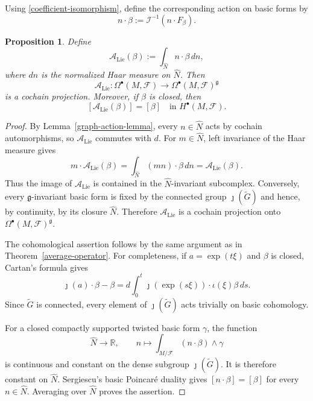 \documentclass[reqno, 11pt]{amsart}
\newtheorem{prop}[thm]{Proposition}
\theoremstyle{definition}
\theoremstyle{property}
\theoremstyle{remark}
\numberwithin{equation}{section}
\begin{document}
Using \eqref{coefficient-isomorphism}, define the corresponding action on
basic forms by
\[
n\cdot\beta
:=
\mathcal I^{-1}(n\cdot F_\beta).
\]

\begin{prop}\label{direct-lie-averaging}
Define
\begin{equation}\label{direct-average}
\mathcal A_{\mathrm{Lie}}(\beta)
:=
\int_{\widehat N}n\cdot\beta\,dn,
\end{equation}
where $dn$ is the normalized Haar measure on $\widehat N$. Then
\[
\mathcal A_{\mathrm{Lie}}:
\Omega^\bullet(M,\mathcal F)
\longrightarrow
\Omega^\bullet(M,\mathcal F)^{\mathfrak g}
\]
is a cochain projection. Moreover, if $\beta$ is closed, then
\[
[\mathcal A_{\mathrm{Lie}}(\beta)]
=
[\beta]
\quad\text{in }H^\bullet(M,\mathcal F).
\]
\end{prop}

\begin{proof}
By Lemma~\ref{graph-action-lemma}, every $n\in\widehat N$ acts by cochain
automorphisms, so $\mathcal A_{\mathrm{Lie}}$ commutes with $d$. For
$m\in\widehat N$, left invariance of the Haar measure gives
\[
m\cdot\mathcal A_{\mathrm{Lie}}(\beta)
=
\int_{\widehat N}(mn)\cdot\beta\,dn
=
\mathcal A_{\mathrm{Lie}}(\beta).
\]
Thus the image of $\mathcal A_{\mathrm{Lie}}$ is contained in the
$\widehat N$-invariant subcomplex. Conversely, every
$\mathfrak g$-invariant basic form is fixed by the connected group
$\jmath(\widetilde G)$ and hence, by continuity, by its closure
$\widehat N$. Therefore $\mathcal A_{\mathrm{Lie}}$ is a cochain projection
onto $\Omega^\bullet(M,\mathcal F)^{\mathfrak g}$.

The cohomological assertion follows by the same argument as in
Theorem~\ref{average-operator}. For completeness, if
$a=\exp(t\xi)$ and $\beta$ is closed, Cartan's formula gives
\[
\jmath(a)\cdot\beta-\beta
=
d\int_0^t
\jmath(\exp(s\xi))\cdot\iota(\xi)\beta\,ds.
\]
Since $\widetilde G$ is connected, every element of
$\jmath(\widetilde G)$ acts trivially on basic cohomology.

For a closed compactly supported twisted basic form $\gamma$, the function
\[
\widehat N\longrightarrow\mathbb R,
\qquad
n\longmapsto
\int_{M/\mathcal F}(n\cdot\beta)\wedge\gamma
\]
is continuous and constant on the dense subgroup
$\jmath(\widetilde G)$. It is therefore constant on $\widehat N$.
Sergiescu's basic Poincar\'e duality gives
$[n\cdot\beta]=[\beta]$ for every $n\in\widehat N$. Averaging over
$\widehat N$ proves the assertion.
\end{proof}
\end{document}
